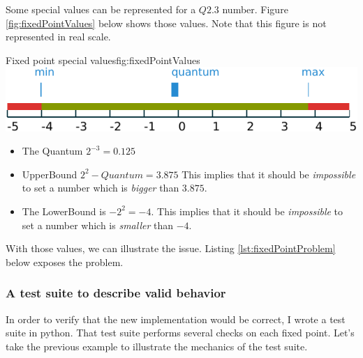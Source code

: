 Some special values can be represented for a $Q2.3$ number. Figure \ref{fig:fixedPointValues} below shows those values. Note that
this figure is not represented in real scale.
\begin{figureGraphics}{Fixed point special values}{fig:fixedPointValues}
    \includegraphics[width=\textwidth]{./src/img/fixedPoint.pdf}
\end{figureGraphics}

\begin{itemize}
    \item The Quantum $2^{-3} = 0.125$
    \item UpperBound $2^2 - Quantum = 3.875$
        This implies that it should be \emph{impossible} to set a number which is \emph{bigger} than $3.875$.
    \item The LowerBound is $-2^2 = -4$.
        This implies that it should be \emph{impossible} to set a number which is \emph{smaller} than $-4$.
\end{itemize}

With those values, we can illustrate the issue.
Listing \ref {lst:fixedPointProblem} below exposes the problem.



\subsubsection{A test suite to describe valid behavior}

In order to verify that the new implementation would be correct, I wrote a test suite
in \gls{python}. That test suite performs several checks on each fixed point. Let's
take the previous example to illustrate the mechanics of the test suite.

